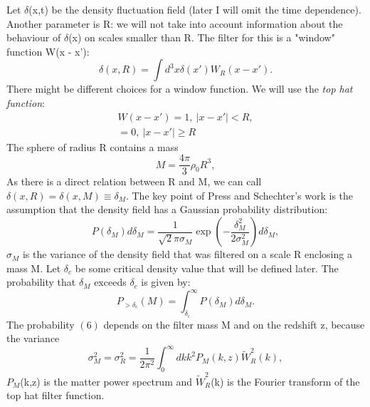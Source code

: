 \documentclass[11pt]{article}
\begin{document}
Let $\delta$(x,t) be the density fluctuation field (later I will omit the time dependence).  Another parameter is R: we will not take into account information about the behaviour of $\delta$(x) on scales smaller than R. The filter for this is a "window" function W(x - x'):
\begin{equation}
	\delta(x,R) = \int d^3x \delta(x')W_{R}(x-x').
\end{equation}
There might be different choices for a window function. We will use the \textit{top hat function}:
\begin{equation}
	\begin{split}
	W (x - x') = 1,\ |x-x'|<R,\\ = 0,\ |x-x'| \geq  R
	\end{split}
\end{equation}  
The sphere of radius R contains a mass
\begin{equation}
M = \frac{4\pi}{3}\rho_0 R^3,
\end{equation}
As there is a direct relation between R and M, we can call $\delta(x,R)=\delta(x,M) \equiv \delta_M.$
The key point of Press and Schechter's work  is the assumption that the density field has a Gaussian probability distribution:
\begin{equation}
P(\delta_M)d \delta_M = \frac{1}{ \sqrt{2} \pi \sigma _M} \exp(-\frac{\delta_{M}^{2}}{2\sigma_{M}^{2}})d \delta_M, 
\end{equation}
$\sigma_M$ is the variance of the density field that was filtered on a scale R enclosing a mass M.
Let $\delta_c$ be some critical density value that will be defined later. The probability that $\delta_M$ exceeds $\delta_c$ is given by:
\begin{equation}
P_{> \delta_c} (M) = \int_{\delta_c}^{\infty} P(\delta_M)d \delta_M.
\end{equation}
The probability $(6)$ depends on the filter mass M and on the redshift z, because the variance
\begin{equation}
\sigma_{M}^{2} = \sigma_{R}^{2} = \frac{1}{2\pi^2} \int_{0}^{\infty} dkk^2P_M(k,z)\tilde{W}_{R}^{2}(k),
\end{equation}
$P_M$(k,z) is the matter power spectrum and $\tilde{W}_{R}^{2}$(k) is the Fourier transform of the top hat filter function. 
\end{document}
